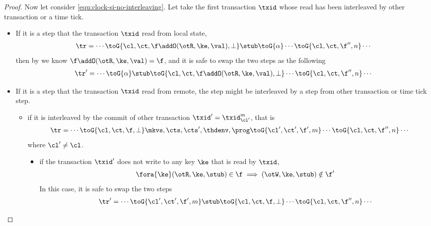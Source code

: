 \begin{proof}
    Now let consider \cref{equ:clock-si-no-interleaving}.
    Let take the first transaction \( \txid \) whose read has been interleaved by other transaction or a time tick.
    \begin{itemize}
        \item If it is a step that the transaction \( \txid \) read from local state,
        \[
        \begin{array}{@{}l@{}}
            \tr = \cdots \toG{\cl,\ct,\f \addO (\otR, \ke, \val ),\perp} \stub  \toG{\alpha} \cdots  \toG{\cl,\ct,\f'',n} \cdots \\
        \end{array}
        \]
        then by  we know \( \f \addO (\otR, \ke, \val ) = \f\), and it is safe to swap the two steps as the following
        \[
        \begin{array}{@{}l@{}}
            \tr' = \cdots \toG{\alpha} \stub \toG{\cl,\ct,\f \addO (\otR, \ke, \val ),\perp} \cdots \toG{\cl,\ct,\f'',n} \cdots \\
        \end{array}
        \]
        \item If it is a step that the transaction \( \txid \) read from remote, 
            the step might be interleaved by a step from other transaction or time tick step.
        \begin{itemize}                                                                       
            \item if it is interleaved by the commit of other transaction \( \txid' = \txid_{\cl'}^m \), that is
        \[
        \begin{array}{@{}l@{}}
            \tr = \cdots \toG{\cl,\ct,\f,\perp} \mkvs, \cts, \cts', \thdenv, \prog  \toG{\cl',\ct',\f',m} \cdots \toG{\cl,\ct,\f'',n} \cdots \\
        \end{array}
        \]
        where \( \cl' \neq \cl \).
        \begin{itemize}
            \item if the transaction \( \txid' \) does not write to any key \( \ke \) that is read by \( \txid \),
                \[
                    \fora{\ke} (\otR, \ke, \stub) \in \f \implies (\otW, \ke, \stub) \notin \f'
                \]
            In this case, it is safe to swap the two steps
            \[
            \begin{array}{@{}l@{}}
                \tr' = \cdots \toG{\cl',\ct',\f',m} \stub \toG{\cl,\ct,\f,\perp} \cdots \toG{\cl,\ct,\f'',n} \cdots \\

\end{array}\]
\end{itemize}
\end{itemize}
\end{itemize}
\end{proof}
